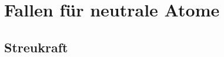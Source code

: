 \documentclass[12pt,xcolor=dvipsnames,professionalfonts]{beamer}
\begin{document}
%
%

\section{Fallen für neutrale Atome}

\subsection{Streukraft}
\end{document}
